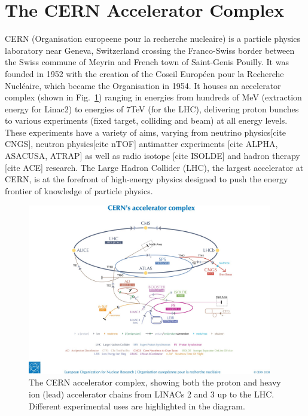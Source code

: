 \section{The CERN Accelerator Complex}

CERN (Organisation europeene pour la recherche nucleaire) is a particle physics laboratory near Geneva, Switzerland crossing the Franco-Swiss border between the Swiss commune of Meyrin and French town of Saint-Genis Pouilly. It was founded in 1952 with the creation of the Coseil Europ\'{e}en pour la Recherche Nucl\'{e}aire, which became the Organisation in 1954. It houses an accelerator complex (shown in Fig.~\ref{fig:CERN-acc-complex}) ranging in energies from hundreds of MeV (extraction energy for Linac2) to energies of 7TeV (for the LHC), delivering proton bunches to various experiments (fixed target, colliding and beam) at all energy levels. These experiments have a variety of aims, varying from neutrino physics[cite CNGS], neutron physics[cite nTOF] antimatter experiments [cite ALPHA, ASACUSA, ATRAP] as well as radio isotope [cite ISOLDE] and hadron therapy [cite ACE] research. The Large Hadron Collider (LHC), the largest accelerator at CERN, is at the forefront of high-energy physics designed to push the energy frontier of knowledge of particle physics.

\begin{figure}
\begin{center}
\includegraphics[width=0.95\textwidth]{Introduction/figures/cernaccelerators.jpg}
\end{center}
\label{fig:CERN-acc-complex}
\caption{The CERN accelerator complex, showing both the proton and heavy ion (lead) accelerator chains from LINACs 2 and 3 up to the LHC. Different experimental uses are highlighted in the diagram.}
\end{figure}

